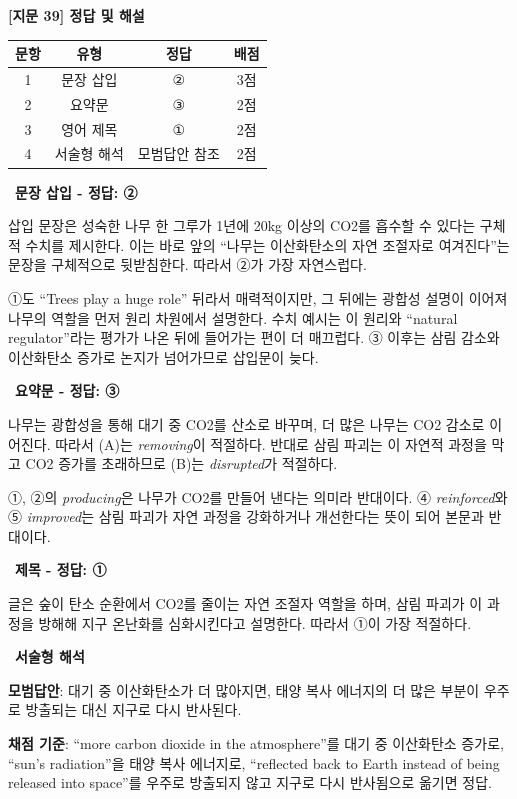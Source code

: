 \documentclass[11pt,a4paper]{article}
\newcommand{\qno}[1]{\par\vspace{10pt}{\sffamily\bfseries #1.}\ }
\begin{document}
\begin{center}
{\fontsize{15}{17}\selectfont\sffamily\bfseries [지문 39] 정답 및 해설}
\end{center}
\vspace{6pt}
\begin{center}
\renewcommand{\arraystretch}{1.35}
\begin{tabular}{cccc}
\toprule
문항 & 유형 & 정답 & 배점 \\
\midrule
1 & 문장 삽입 & ② & 3점 \\
2 & 요약문 & ③ & 2점 \\
3 & 영어 제목 & ① & 2점 \\
4 & 서술형 해석 & 모범답안 참조 & 2점 \\
\bottomrule
\end{tabular}
\end{center}

\qno{1}\textbf{문장 삽입 - 정답: ②}
\begin{pbox}
삽입 문장은 성숙한 나무 한 그루가 1년에 20kg 이상의 CO2를 흡수할 수 있다는 구체적 수치를 제시한다. 이는 바로 앞의 ``나무는 이산화탄소의 자연 조절자로 여겨진다''는 문장을 구체적으로 뒷받침한다. 따라서 ②가 가장 자연스럽다.

\medskip
①도 ``Trees play a huge role'' 뒤라서 매력적이지만, 그 뒤에는 광합성 설명이 이어져 나무의 역할을 먼저 원리 차원에서 설명한다. 수치 예시는 이 원리와 ``natural regulator''라는 평가가 나온 뒤에 들어가는 편이 더 매끄럽다. ③ 이후는 삼림 감소와 이산화탄소 증가로 논지가 넘어가므로 삽입문이 늦다.
\end{pbox}

\qno{2}\textbf{요약문 - 정답: ③}
\begin{pbox}
나무는 광합성을 통해 대기 중 CO2를 산소로 바꾸며, 더 많은 나무는 CO2 감소로 이어진다. 따라서 (A)는 \textit{removing}이 적절하다. 반대로 삼림 파괴는 이 자연적 과정을 막고 CO2 증가를 초래하므로 (B)는 \textit{disrupted}가 적절하다.

\medskip
①, ②의 \textit{producing}은 나무가 CO2를 만들어 낸다는 의미라 반대이다. ④ \textit{reinforced}와 ⑤ \textit{improved}는 삼림 파괴가 자연 과정을 강화하거나 개선한다는 뜻이 되어 본문과 반대이다.
\end{pbox}
\vspace{8pt}
\qno{3}\textbf{제목 - 정답: ①}
\begin{pbox}
글은 숲이 탄소 순환에서 CO2를 줄이는 자연 조절자 역할을 하며, 삼림 파괴가 이 과정을 방해해 지구 온난화를 심화시킨다고 설명한다. 따라서 ①이 가장 적절하다.
\end{pbox}

\qno{4}\textbf{서술형 해석}
\begin{pbox}
\textbf{모범답안}: 대기 중 이산화탄소가 더 많아지면, 태양 복사 에너지의 더 많은 부분이 우주로 방출되는 대신 지구로 다시 반사된다.

\medskip
\textbf{채점 기준}: ``more carbon dioxide in the atmosphere''를 대기 중 이산화탄소 증가로, ``sun's radiation''을 태양 복사 에너지로, ``reflected back to Earth instead of being released into space''를 우주로 방출되지 않고 지구로 다시 반사됨으로 옮기면 정답.
\end{pbox}
\end{document}

